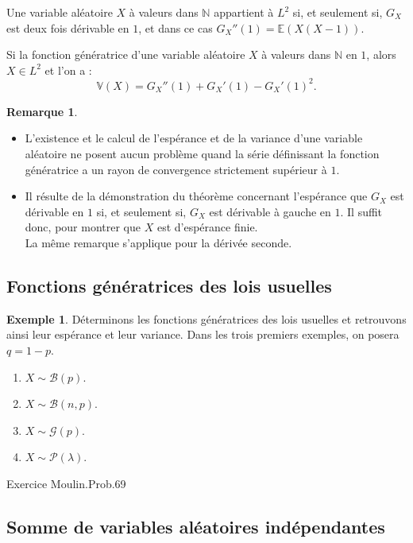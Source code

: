 \documentclass[french]{article}
\newcommand{\N}{\mathbb{N}}
\newcommand{\E}{\mathbb{E}}
\newcommand{\V}{\mathbb{V}}
\theoremstyle{plain}
\theoremstyle{definition}
\newtheorem*{ex}{Exemple}
\newtheorem*{rmq}{Remarque}
\theoremstyle{remark}
\begin{document}
\begin{thm}{}%
	Une variable aléatoire $X$ à valeurs dans $\N$ appartient à $L^2$ si, et seulement si, $G_X$ est deux fois dérivable en $1$, et dans ce cas $G_X''(1)=\E(X(X-1))$.
\end{thm}

\begin{thm}{}%
	Si la fonction génératrice d'une variable aléatoire $X$ à valeurs dans $\N$ en $1$, alors $X\in L^2$ et l'on a : $$\V(X)=G_X''(1)+G_X'(1)-G_X'(1)^2.$$
\end{thm}

\begin{rmq}
	\begin{itemize}
		\item L'existence et le calcul de l'espérance et de la variance d'une variable aléatoire ne posent aucun problème quand la série définissant la fonction génératrice a un rayon de convergence strictement supérieur à $1$.
		\item Il résulte de la démonstration du théorème concernant l'espérance que $G_X$ est dérivable en $1$ si, et seulement si, $G_X$ est dérivable à gauche en $1$. Il suffit donc, pour montrer que $X$ est d'espérance finie.\\
		La même remarque s'applique pour la dérivée seconde.
	\end{itemize}
\end{rmq}

\subsection{Fonctions génératrices des lois usuelles}

\begin{ex}
	Déterminons les fonctions génératrices des lois usuelles et retrouvons ainsi leur espérance et leur variance. Dans les trois premiers exemples, on posera $q=1-p$.
	\begin{enumerate}
		\item $X\sim\mathcal{B}(p)$. %
		\item $X\sim\mathcal{B}(n,p)$. %
		\item $X\sim\mathcal{G}(p)$. %
		\item $X\sim\mathcal{P}(\lambda)$. %
	\end{enumerate}
\end{ex}

Exercice Moulin.Prob.69

\subsection{Somme de variables aléatoires indépendantes}
\end{document}
